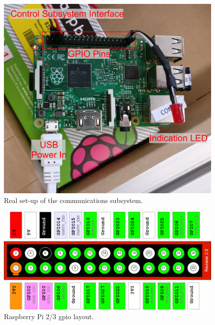 \documentclass[twoside,a4paper]{refart}
\begin{document}
\begin{figure}[H]
	\centering
	\includegraphics[width=1.0\linewidth]{ph_com}
	\caption{Real set-up of the communications subsystem.}
	\label{fig:ph_com}
\end{figure}

\begin{figure}[H]
	\centering
	\includegraphics[width=1.0\linewidth]{rpi2_gpio}
	\caption{Raspberry Pi 2/3 \gls{gpio} layout.}
	\label{fig:rpi2_gpio}
\end{figure}
\end{document}
